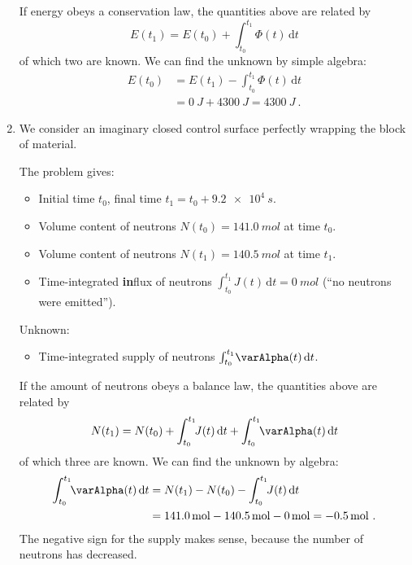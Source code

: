 \documentclass[a4paper,12pt,%
onecolumn,oneside,%
british%
]{memoir}
\newcommand*{\di}{\mathrm{d}}%
\renewcommand*{\|}[1][]{\nonscript\:#1\vert\nonscript\:\mathopen{}}
\newcommand*{\yti}{t_{0}}
\newcommand*{\ytf}{t_{1}}
\newcommand*{\yN}{N}
\newcommand*{\yJ}{J}
\newcommand*{\ya}{\varAlpha}
\newcommand*{\yE}{E}
\newcommand*{\yH}{\varPhi}%
\begin{document}
\begin{enumerate}[exerc]
  If energy obeys a conservation law, the quantities above are related by
  \begin{equation*}
    \yE(\ytf) = \yE(\yti) + \int_{\yti}^{\ytf}\!\!\yH(t)\, \di t
  \end{equation*}
of which two are known. We can find the unknown by simple algebra:
\begin{equation*}
  \begin{split}
    \yE(\yti) &= \yE(\ytf) - \int_{\yti}^{\ytf}\!\!\yH(t)\, \di t
    \\&= \qty{0}{J} + \qty{4300}{J} 
    = \qty{4300}{J} \ .
  \end{split}
\end{equation*}

\item We consider an imaginary closed control surface perfectly wrapping the block of material.

  The problem gives:
  \begin{itemize}[nosep]
  \item Initial time $\yti$, final time $\ytf=\yti + \qty{9.2e4}{s}$.
  \item Volume content of neutrons $\yN(\yti)=\qty{141.0}{mol}$ at time $\yti$.
  \item Volume content of neutrons $\yN(\ytf)=\qty{140.5}{mol}$ at time $\ytf$.
  \item Time-integrated \textbf{in}flux of neutrons $\int_{\yti}^{\ytf}\!\yJ(t)\,\di t = \qty{0}{mol}$ (\enquote{no neutrons were emitted}).
  \end{itemize}
  Unknown:
  \begin{itemize}[nosep]
  \item Time-integrated supply of neutrons $\int_{\yti}^{\ytf}\!\ya(t)\,\di t$.
  \end{itemize}

  If the amount of neutrons obeys a balance law, the quantities above are related by
  \begin{equation*}
    \yN(\ytf) = \yN(\yti) + \int_{\yti}^{\ytf}\!\!\yJ(t)\, \di t
    + \int_{\yti}^{\ytf}\!\!\ya(t)\, \di t
  \end{equation*}
of which three are known. We can find the unknown by algebra:
\begin{equation*}
  \begin{split}
    \int_{\yti}^{\ytf}\!\!\ya(t)\, \di t &=    \yN(\ytf) - \yN(\yti)
    - \int_{\yti}^{\ytf}\!\!\yJ(t)\, \di t
    \\&= \qty{141.0}{mol} - \qty{140.5}{mol} - \qty{0}{mol}
    = -\qty{0.5}{mol} \ .
  \end{split}
\end{equation*}
The negative sign for the supply makes sense, because the number of neutrons has decreased.


\end{enumerate}
\end{document}
